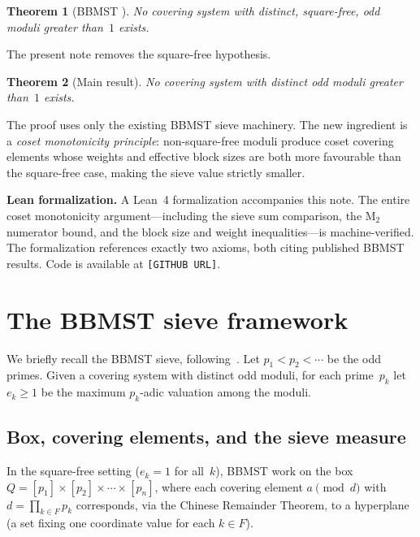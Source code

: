 \documentclass[11pt]{amsart}
\newtheorem{theorem}{Theorem}[section]
\theoremstyle{definition}
\theoremstyle{remark}
\begin{document}
\begin{theorem}[BBMST {\cite[Theorem~1.1]{BBMST2019}}]\label{thm:bbmst}
No covering system with distinct, square-free, odd moduli greater than~$1$ exists.
\end{theorem}

The present note removes the square-free hypothesis.

\begin{theorem}[Main result]\label{thm:main}
No covering system with distinct odd moduli greater than~$1$ exists.
\end{theorem}

The proof uses only the existing BBMST sieve machinery.
The new ingredient is a \emph{coset monotonicity principle}:
non-square-free moduli produce coset covering elements whose weights and
effective block sizes are both more favourable than the square-free case,
making the sieve value strictly smaller.

\smallskip
\noindent\textbf{Lean formalization.}
A Lean~4 formalization accompanies this note.
The entire coset monotonicity argument---including
the sieve sum comparison, the M$_2$ numerator bound, and the
block size and weight inequalities---is machine-verified.
The formalization references exactly two axioms, both citing published
BBMST results.
Code is available at \texttt{[GITHUB URL]}.

\section{The BBMST sieve framework}\label{sec:bbmst}

We briefly recall the BBMST sieve, following~\cite{BBMST2019}.
Let $p_1 < p_2 < \cdots$ be the odd primes.
Given a covering system with distinct odd moduli,
for each prime~$p_k$ let $e_k \ge 1$ be the maximum $p_k$-adic valuation
among the moduli.

\subsection{Box, covering elements, and the sieve measure}
In the square-free setting ($e_k = 1$ for all~$k$), BBMST work on the box
$Q = [p_1] \times [p_2] \times \cdots \times [p_n]$,
where each covering element $a \pmod{d}$ with $d = \prod_{k \in F} p_k$
corresponds, via the Chinese Remainder Theorem, to a hyperplane
(a set fixing one coordinate value for each $k \in F$).
\end{document}

